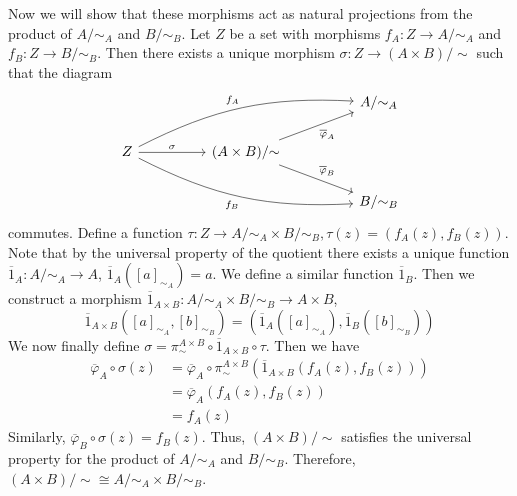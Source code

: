 \documentclass[../../master.tex]{subfiles}
\begin{document}
\begin{solution}
      Now we will show that these morphisms act as natural projections from the product of \(A / {\sim_{A}}\) and \(B / {\sim_{B}}\).
      Let \(Z\) be a set with morphisms \(f_{A}: Z \to A / {\sim_{A}}\) and \(f_{B}: Z \to B / {\sim_{B}}\).
      Then there exists a unique morphism \(\sigma: Z \to (A \times B) / {\sim}\) such that the diagram
      \[
      \begin{tikzcd}
        &&&& {A / {\sim_{A}}} \\
        {Z} && {(A \times B) / {\sim}} \\
        &&&& {B / {\sim_{B}}}
        \arrow["{\sigma}", from=2-1, to=2-3]
        \arrow["{\overline{\varphi}_{A}}"', from=2-3, to=1-5]
        \arrow["{\overline{\varphi}_{B}}", from=2-3, to=3-5]
        \arrow["{f_{A}}", from=2-1, to=1-5, bend left=15]
        \arrow["{f_{B}}"', from=2-1, to=3-5, bend right=15]
      \end{tikzcd}
      \]
      commutes.
      Define a function \(\tau: Z \to A / {\sim_{A}} \times B / {\sim_{B}}, \tau(z) = (f_{A}(z), f_{B}(z))\).
      Note that by the universal property of the quotient there exists a unique function \(\overline{1}_{A}: A / {\sim_{A}} \to A\), \(\overline{1}_{A}([a]_{\sim_{A}}) = a\).
      We define a similar function \(\overline{1}_{B}\).
      Then we construct a morphism \(\overline{1}_{A \times B}: A / {\sim_{A}} \times B / {\sim_{B}} \to A \times B\),
      \begin{equation*}
        \overline{1}_{A \times B}([a]_{\sim_{A}}, [b]_{\sim_{B}}) = (\overline{1}_{A}([a]_{\sim_{A}}), \overline{1}_{B}([b]_{\sim_{B}}))
      \end{equation*}
      We now finally define \(\sigma = \pi_{\sim}^{A \times B} \circ \overline{1}_{A \times B} \circ \tau\).
      Then we have
      \begin{align*}
        \overline{\varphi}_{A} \circ \sigma(z) &= \overline{\varphi}_{A} \circ \pi_{\sim}^{A \times B} (\overline{1}_{A \times B}(f_{A}(z), f_{B}(z))) \\
        &= \overline{\varphi}_{A} (f_{A}(z), f_{B}(z)) \\
        &= f_{A}(z)
      \end{align*}
      Similarly, \(\overline{\varphi}_{B} \circ \sigma(z) = f_{B}(z)\).
      Thus, \((A \times B) / {\sim}\) satisfies the universal property for the product of \(A / {\sim_{A}}\) and \(B / {\sim_{B}}\).
      Therefore, \((A \times B) / {\sim} \cong A / {\sim_{A}} \times B / {\sim_{B}}\).
    \end{solution}
\end{document}
